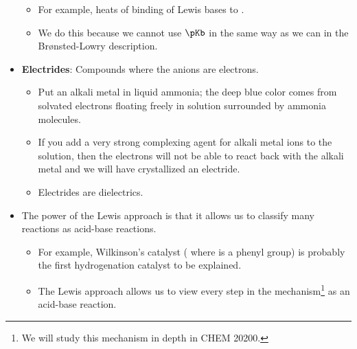 \documentclass[../notes.tex]{subfiles}
\begin{document}
\begin{itemize}
    \begin{itemize}
        \item For example, heats of binding of Lewis bases to .
        \item We do this because we cannot use $\pKb$ in the same way as we can in the Br{\o}nsted-Lowry description.
    \end{itemize}
    \item \textbf{Electrides}: Compounds where the anions are electrons.
    \begin{itemize}
        \item Put an alkali metal in liquid ammonia; the deep blue color comes from solvated electrons floating freely in solution surrounded by ammonia molecules.
        \item If you add a very strong complexing agent for alkali metal ions to the solution, then the electrons will not be able to react back with the alkali metal and we will have crystallized an electride.
        \item Electrides are dielectrics.
    \end{itemize}
    \item The power of the Lewis approach is that it allows us to classify many reactions as acid-base reactions.
    \begin{itemize}
        \item For example, Wilkinson's catalyst ( where  is a phenyl group) is probably the first hydrogenation catalyst to be explained.
        \item The Lewis approach allows us to view every step in the mechanism\footnote{We will study this mechanism in depth in CHEM 20200.} as an acid-base reaction.
    \end{itemize}
\end{itemize}
\end{document}
